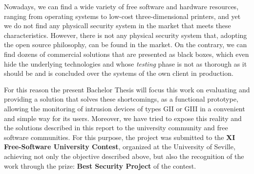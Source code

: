 Nowadays, we can find a wide variety of free software and hardware resources, \mbox{ranging} from operating systems to low-cost \mbox{three-dimensional} printers, and yet we do not find any physicall security system in the market that meets these characteristics. However, there is not any physical security system that, adopting the open source philosophy, can be found in the market. On the contrary, we can find dozens of \mbox{commercial} solutions that are \mbox{presented} as black boxes, which even hide the underlying technologies and whose \textit{testing} phase is not as thorough as it should be and is concluded over the systems of the own client in \mbox{production}. 

For this reason the present Bachelor Thesis will focus this work on evaluating and \mbox{providing} a solution that solves these shortcomings, as a functional prototype, allowing the \mbox{monitoring} of intrusion devices of types \acs{GII} or \acs{GIII} in a convenient and simple way for its users. \mbox{Moreover},  we have tried to expose this reality and the solutions described in this report to the university \mbox{community} and free software communities. For this purpose, the project was submitted to the \textbf{XI Free-Software \mbox{University} Contest}, organized at the University of \mbox{Seville}, \mbox{achieving} not only the objective described above, but also the recognition of the work through the prize: \textbf{Best Security Project} of the contest.
